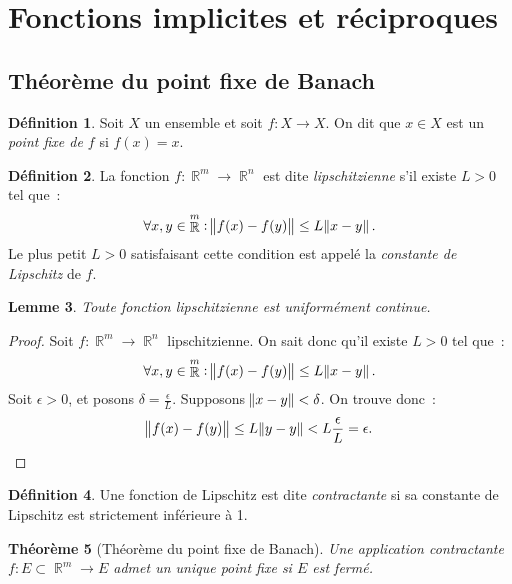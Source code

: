 \documentclass{article}
\DeclareMathOperator{\R}{\mathbb R}
\newtheorem{thm}{Théorème}[section]
\newtheorem{lem}[thm]{Lemme}
\theoremstyle{definition}
\newtheorem{déf}[thm]{Définition}
\theoremstyle{remark}
\begin{document}
\newpage
\section{Fonctions implicites et réciproques}
	\subsection{Théorème du point fixe de Banach}
		\begin{déf} Soit $X$ un ensemble et soit $f : X \to X$. On dit que $x \in X$ est un \emph{point fixe de $f$} si $f(x) = x$.
		\end{déf}

		\begin{déf} La fonction $f : \R^m \to \R^n$ est dite \emph{lipschitzienne} s'il existe $L > 0$ tel que~:
		\[\forall x, y \in \R^m : \norm{f(x)-f(y)} \leq L\norm{x-y}.\]
		Le plus petit $L > 0$ satisfaisant cette condition est appelé la \emph{constante de Lipschitz} de $f$.
		\end{déf}

		\begin{lem} Toute fonction lipschitzienne est uniformément continue.
		\end{lem}

		\begin{proof} Soit $f : \R^m \to \R^n$ lipschitzienne. On sait donc qu'il existe $L > 0$ tel que~:
		\[\forall x, y \in \R^m : \norm{f(x) - f(y)} \leq L\norm{x-y}.\]
		Soit $\epsilon > 0$, et posons $\delta = \frac \epsilon L$. Supposons $\norm {x-y} < \delta$. On trouve donc~:
		\[\norm{f(x)-f(y)} \leq L\norm{y-y} < L\frac \epsilon L = \epsilon.\]
		\end{proof}

		\begin{déf} Une fonction de Lipschitz est dite \emph{contractante} si sa constante de Lipschitz est strictement inférieure à 1.
		\end{déf}

		\begin{thm}[Théorème du point fixe de Banach] Une application contractante $f : E \subset \R^m \to E$ admet un unique point fixe si $E$ est fermé.
		\end{thm}
\end{document}
